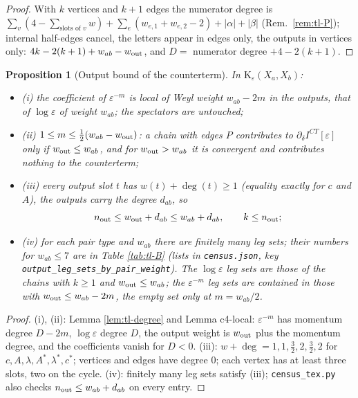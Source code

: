 \documentclass[11pt]{article}
\numberwithin{equation}{section}
\theoremstyle{plain}
\newtheorem{proposition}[theorem]{Proposition}
\theoremstyle{definition}
\begin{document}
\begin{proof}
With $k$ vertices and $k+1$ edges the numerator degree is $\sum_v(4-\sum_{\text{slots of }v}w)+\sum_e(w_{e,1}+w_{e,2}-2)+|\alpha|+|\beta|$ (Rem.~\ref{rem:tl-P}); internal half-edges cancel, the letters appear in edges only, the outputs in vertices only: $4k-2(k+1)+w_{ab}-w_{\rm out}$, and $D=$ numerator degree $+4-2(k+1)$.
\end{proof}

\begin{proposition}[Output bound of the counterterm]
\label{prop:tl-bound}
In $\mathrm K_\varepsilon(X_a,X_b)$:
\begin{itemize}
\item (i) the coefficient of $\varepsilon^{-m}$ is local of Weyl weight $w_{ab}-2m$ in the outputs, that of $\log\varepsilon$ of weight $w_{ab}$; the spectators are untouched;
\item (ii) $1\le m\le\frac12(w_{ab}-w_{\rm out})$: a chain with edges $P$ contributes to $\partial_\delta I^{CT}[\varepsilon]$ only if $w_{\rm out}\le w_{ab}$, and for $w_{\rm out}>w_{ab}$ it is convergent and contributes nothing to the counterterm;
\item (iii) every output slot $t$ has $w(t)+\deg(t)\ge1$ (equality exactly for $c$ and $A$), the outputs carry the degree $d_{ab}$, so
\[
n_{\rm out}\le w_{\rm out}+d_{ab}\le w_{ab}+d_{ab},\qquad k\le n_{\rm out};
\]
\item (iv) for each pair type and $w_{ab}$ there are finitely many leg sets; their numbers for $w_{ab}\le7$ are in Table \ref{tab:tl-B} (lists in \texttt{census.json}, key \texttt{output\_leg\_sets\_by\_pair\_weight}). The $\log\varepsilon$ leg sets are those of the chains with $k\ge1$ and $w_{\rm out}\le w_{ab}$; the $\varepsilon^{-m}$ leg sets are contained in those with $w_{\rm out}\le w_{ab}-2m$, the empty set only at $m=w_{ab}/2$.
\end{itemize}
\end{proposition}

\begin{proof}
(i), (ii): Lemma \ref{lem:tl-degree} and Lemma c4-local: $\varepsilon^{-m}$ has momentum degree $D-2m$, $\log\varepsilon$ degree $D$, the output weight is $w_{\rm out}$ plus the momentum degree, and the coefficients vanish for $D<0$. (iii): $w+\deg=1,1,\tfrac32,2,\tfrac32,2$ for $c,A,\lambda,A^*,\lambda^*,c^*$; vertices and edges have degree $0$; each vertex has at least three slots, two on the cycle. (iv): finitely many leg sets satisfy (iii); \texttt{census\_tex.py} also checks $n_{\rm out}\le w_{ab}+d_{ab}$ on every entry.
\end{proof}
\end{document}
